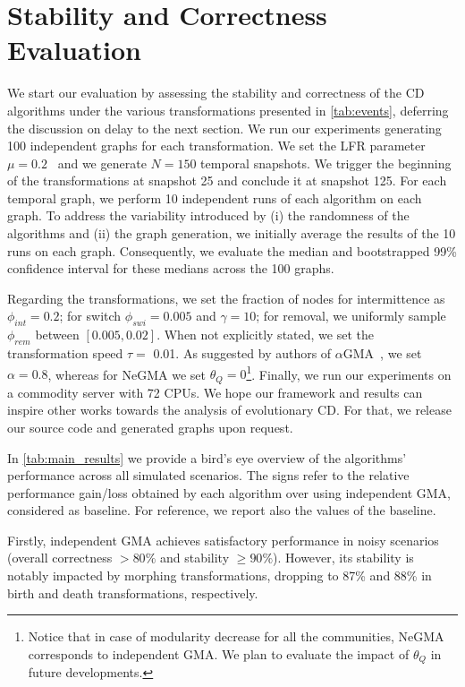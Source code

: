 \documentclass[letterpaper]{article}
\begin{document}
\section{Stability and Correctness Evaluation}
\label{s:experiments}

We start our evaluation by assessing the stability and correctness of the CD algorithms under the various transformations presented in \cref{tab:events}, deferring the discussion on delay to the next section.
We run our experiments generating 100 independent graphs for each transformation. We set the LFR parameter $\mu=0.2$~\cite{lancichinetti2008benchmark} and we generate $N=150$ temporal snapshots. We trigger the beginning of the transformations at snapshot 25 and conclude it at snapshot 125. For each temporal graph, we perform 10 independent runs of each algorithm on each graph.
To address the variability introduced by (i) the randomness of the algorithms and (ii) the graph generation, we initially average the results of the 10 runs on each graph. Consequently, we evaluate the median and bootstrapped 99\% confidence interval for these medians across the 100 graphs. 

Regarding the transformations, we set the fraction of nodes for intermittence as $\phi_{int}=0.2$; for switch $\phi_{swi}=0.005$ and $\gamma=10$; for removal, we uniformly sample $\phi_{rem}$ between $[0.005, 0.02]$. When not explicitly stated, we set the transformation speed $\tau =$ 0.01. 
As suggested by authors of $\alpha$GMA~\cite{elegazzar2021alpha}, we set $\alpha=0.8$, whereas for NeGMA we set $\theta_Q = 0$\footnote{Notice that in case of modularity decrease for all the communities, NeGMA corresponds to independent GMA. We plan to evaluate the impact of $\theta_Q$ in future developments.}.
Finally, we run our experiments on a commodity server with 72 CPUs. We hope our framework and results can inspire other works towards the analysis of evolutionary CD. For that, we release our source code and generated graphs upon request.

In \cref{tab:main_results} we provide a bird's eye overview of the algorithms' performance across all simulated scenarios. The signs refer to the relative performance gain/loss obtained by each algorithm over using independent GMA, considered as baseline. For reference, we report also the values of the baseline.

Firstly, independent GMA achieves satisfactory performance in noisy scenarios (overall correctness $>80\%$ and stability $\geq90\%$). However, its stability is notably impacted by morphing transformations, dropping to  87\% and 88\% in birth and death transformations, respectively. 
\end{document}
